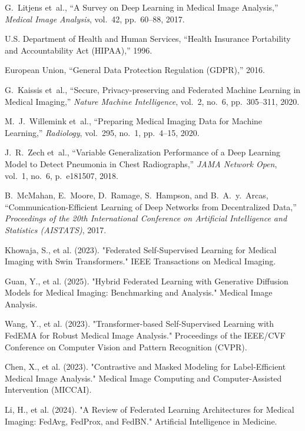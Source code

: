 \documentclass[a4paper, 10 pt, conference]{ieeeconf}
\begin{document}
\begin{thebibliography}{99}

G.~Litjens et~al., ``A Survey on Deep Learning in Medical Image Analysis,'' \emph{Medical Image Analysis}, vol.~42, pp.~60--88, 2017.

U.S. Department of Health and Human Services, ``Health Insurance Portability and Accountability Act (HIPAA),'' 1996.

European Union, ``General Data Protection Regulation (GDPR),'' 2016.

G.~Kaissis et~al., ``Secure, Privacy-preserving and Federated Machine Learning in Medical Imaging,'' \emph{Nature Machine Intelligence}, vol.~2, no.~6, pp.~305--311, 2020.

M.~J.~Willemink et~al., ``Preparing Medical Imaging Data for Machine Learning,'' \emph{Radiology}, vol.~295, no.~1, pp.~4--15, 2020.

J.~R.~Zech et~al., ``Variable Generalization Performance of a Deep Learning Model to Detect Pneumonia in Chest Radiographs,'' \emph{JAMA Network Open}, vol.~1, no.~6, p.~e181507, 2018.

B.~McMahan, E.~Moore, D.~Ramage, S.~Hampson, and B.~A.~y.~Arcas, ``Communication-Efficient Learning of Deep Networks from Decentralized Data,'' \emph{Proceedings of the 20th International Conference on Artificial Intelligence and Statistics (AISTATS)}, 2017.

Khowaja, S., et al. (2023). "Federated Self-Supervised Learning for Medical Imaging with Swin Transformers." IEEE Transactions on Medical Imaging.

Guan, Y., et al. (2025). "Hybrid Federated Learning with Generative Diffusion Models for Medical Imaging: Benchmarking and Analysis." Medical Image Analysis.

Wang, Y., et al. (2023). "Transformer-based Self-Supervised Learning with FedEMA for Robust Medical Image Analysis." Proceedings of the IEEE/CVF Conference on Computer Vision and Pattern Recognition (CVPR).

Chen, X., et al. (2023). "Contrastive and Masked Modeling for Label-Efficient Medical Image Analysis." Medical Image Computing and Computer-Assisted Intervention (MICCAI).

Li, H., et al. (2024). "A Review of Federated Learning Architectures for Medical Imaging: FedAvg, FedProx, and FedBN." Artificial Intelligence in Medicine.


\end{thebibliography}
\end{document}
